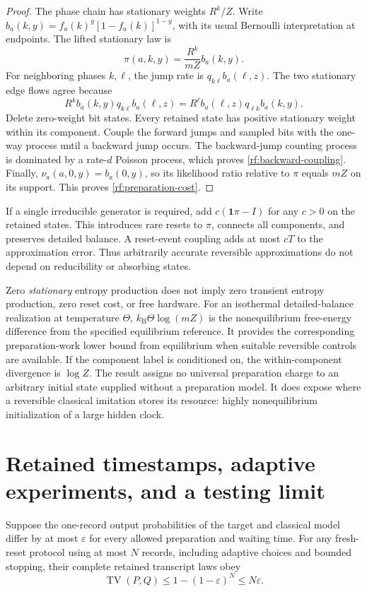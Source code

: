 \begin{proof}
The phase chain has stationary weights $R^k/Z$. Write
$b_a(k,y)=f_a(k)^y[1-f_a(k)]^{1-y}$, with its usual Bernoulli interpretation
at endpoints. The lifted stationary law is
\[
 \pi(a,k,y)=\frac{R^k}{mZ}b_a(k,y).
\]
For neighboring phases $k,\ell$, the jump rate is $q_{k\ell}b_a(\ell,z)$.
The two stationary edge flows agree because
\[
 R^k b_a(k,y)q_{k\ell}b_a(\ell,z)
 =R^\ell b_a(\ell,z)q_{\ell k}b_a(k,y).
\]
Delete zero-weight bit states. Every retained state has positive stationary
weight within its component. Couple the forward jumps and sampled bits with
the one-way process until a backward jump occurs. The backward-jump counting
process is dominated by a rate-$d$ Poisson process, which proves
\eqref{rf:backward-coupling}. Finally,
$\nu_a(a,0,y)=b_a(0,y)$, so its likelihood ratio relative to $\pi$ equals
$mZ$ on its support. This proves \eqref{rf:preparation-cost}.
\end{proof}

If a single irreducible generator is required, add
$c(\mathbf 1\pi-I)$ for any $c>0$ on the retained states. This introduces
rare resets to $\pi$, connects all components, and preserves detailed balance.
A reset-event coupling adds at most $cT$ to the approximation error. Thus
arbitrarily accurate reversible approximations do not depend on reducibility
or absorbing states.

Zero \emph{stationary} entropy production does not imply zero transient
entropy production, zero reset cost, or free hardware. For an isothermal
detailed-balance realization at temperature $\Theta$,
$k_{\mathrm B}\Theta\log(mZ)$ is the nonequilibrium free-energy difference
from the specified equilibrium reference. It provides the corresponding
preparation-work lower bound from equilibrium when suitable reversible
controls are available. If the component label is conditioned on, the
within-component divergence is $\log Z$. The result assigns no universal
preparation charge to an arbitrary initial state supplied without a preparation
model. It does expose where a reversible classical imitation stores its
resource: highly nonequilibrium initialization of a large hidden clock.

\section{Retained timestamps, adaptive experiments, and a testing limit}

\begin{theorem}
\label{rf:transcript-approximation}
Suppose the one-record output probabilities of the target and classical model
differ by at most $\varepsilon$ for every allowed preparation and waiting time.
For any fresh-reset protocol using at most $N$ records, including adaptive
choices and bounded stopping, their complete retained transcript laws obey
\begin{equation}
 \operatorname{TV}(P,Q)\le 1-(1-\varepsilon)^N\le N\varepsilon.
 \label{rf:transcript-tv}
\end{equation}
\end{theorem}

